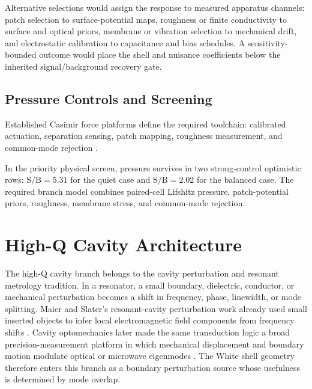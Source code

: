 \documentclass[11pt]{article}
\newcommand{\sbr}{\mathrm{S/B}}
\begin{document}
Alternative selections would assign the response to measured apparatus
channels: patch selection to surface-potential maps, roughness or finite
conductivity to surface and optical priors, membrane or vibration selection to
mechanical drift, and electrostatic calibration to capacitance and bias
schedules. A sensitivity-bounded outcome would place the shell and nuisance
coefficients below the inherited signal/background recovery gate.

\subsection{Pressure Controls and Screening}

Established Casimir force platforms define the required toolchain: calibrated
actuation, separation sensing, patch mapping, roughness measurement, and
common-mode rejection \cite{Decca2011,Stange2019,GarciaSanchez2012,
GarciaSanchez2013}.

In the priority physical screen, pressure survives in two strong-control
optimistic rows: \(\sbr=5.31\) for the quiet case and \(\sbr=2.02\) for the
balanced case. The required branch model combines paired-cell Lifshitz
pressure, patch-potential priors, roughness, membrane stress, and common-mode
rejection.

\section{High-Q Cavity Architecture}

The high-Q cavity branch belongs to the cavity perturbation and resonant
metrology tradition. In a resonator, a small boundary, dielectric, conductor,
or mechanical perturbation becomes a shift in frequency, phase, linewidth, or
mode splitting. Maier and Slater's resonant-cavity perturbation work already
used small inserted objects to infer local electromagnetic field components
from frequency shifts \cite{MaierSlater1952}. Cavity optomechanics later made
the same transduction logic a broad precision-measurement platform in which
mechanical displacement and boundary motion modulate optical or microwave
eigenmodes \cite{Aspelmeyer2014}. The White shell geometry therefore enters
this branch as a boundary perturbation source whose usefulness is determined
by mode overlap.
\end{document}

